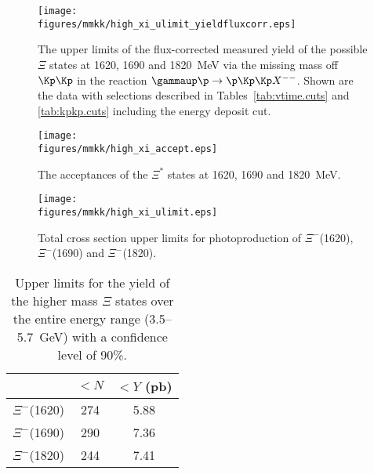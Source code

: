 \begin{figure}[bhpt]\centering
    \texttt{[image: \\figures/mmkk/high\_xi\_ulimit\_yieldfluxcorr.eps]}
    \caption[Higher Mass \texorpdfstring{$\Xi^*$}{Xi*} Measured Yield Upper Limits]{\label{fig:high.xi.yieldflux}The upper limits of the flux-corrected measured yield of the possible $\Xi$ states at 1620, 1690 and 1820~MeV via the missing mass off $\Kp\Kp$ in the reaction $\gammaup \p \rightarrow \p \Kp \Kp X^{--}$. Shown are the data with selections described in Tables~\ref{tab:vtime.cuts} and \ref{tab:kpkp.cuts} including the  energy deposit cut.}
\end{figure}

\begin{figure}[bhpt]\centering
    \texttt{[image: \\figures/mmkk/high\_xi\_accept.eps]}
    \caption[Higher Mass \texorpdfstring{$\Xi*$}{Xi*} Acceptances]{\label{fig:high.xi.accept}The acceptances of the $\Xi^*$ states at 1620, 1690 and 1820~MeV.}
\end{figure}

\begin{figure}[bhpt]\begin{center}
    \texttt{[image: \\figures/mmkk/high\_xi\_ulimit.eps]}
    \caption[$\Xi^*$ Total Cross Section Upper Limits]{\label{fig:high.xi.ulimits}Total cross section upper limits for photoproduction of $\Xi^-$(1620), $\Xi^-$(1690) and $\Xi^-$(1820).}
\end{center}\end{figure}



\begin{table}[bh]\begin{center}
\caption[High Mass \texorpdfstring{$\Xi^-$}{Xi-} Yield Upper Limits]{\label{tab:high.xi.yield}Upper limits for the yield of the higher mass $\Xi$ states over the entire energy range (3.5--5.7~GeV) with a confidence level of 90\%.}
\begin{tabular}{ccc}
\hline \hline
 & $<N$ & $<Y$ (pb) \\
\hline
$\Xi^-$(1620) & 274 & 5.88 \\
$\Xi^-$(1690) & 290 & 7.36 \\
$\Xi^-$(1820) & 244 & 7.41 \\
\hline \hline
\end{tabular}
\end{center}\end{table}

